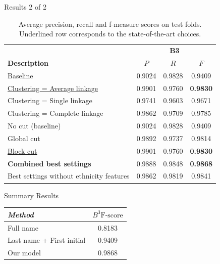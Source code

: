 \documentclass{beamer}
\begin{document}
\begin{frame}{Results 2 of 2}

\begin{table}
\caption{Average precision, recall and f-measure scores on test folds. Underlined row corresponds to the state-of-the-art choices.}
\centering
\begin{tabular}{|l|c c c |}
  \hline
                       & \multicolumn{3}{|c|}{\textbf{B3}}\\
  \textbf{Description} & $P$ & $R$ & $F$ \\
  \hline
  \hline
Baseline & 0.9024 & 0.9828 & 0.9409  \\
\hline
\underline{Clustering = Average linkage} & 0.9901 & 0.9760 & \textbf{0.9830}  \\
Clustering = Single linkage & 0.9741 & 0.9603 & 0.9671  \\
Clustering = Complete linkage & 0.9862 & 0.9709 & 0.9785   \\
\hline
No cut (baseline) & 0.9024 & 0.9828 & 0.9409   \\
Global cut & 0.9892 & 0.9737 & 0.9814   \\
\underline{Block cut} & 0.9901 & 0.9760 & \textbf{0.9830} \\
\hline
\textbf{Combined best settings} & 0.9888 & 0.9848 & \textbf{0.9868}  \\
Best settings without ethnicity features & 0.9862 & 0.9819 & 0.9841 \\
\hline

\end{tabular}
\end{table}

\end{frame}


\begin{frame}{Summary Results}

\begin{table}
    \centering
    \begin{tabular}{| l c |}
    \hline
        \textit{Method} & \textit{$B^3 \text{F-score}$}  \\
    \hline
    \hline
    Full name & 0.8183 \\
    Last name + First initial & 0.9409 \\
    \hline
    Our model & {\color{blue} 0.9868} \\
    \hline
    \end{tabular}
\end{table}

\end{frame}
\end{document}
